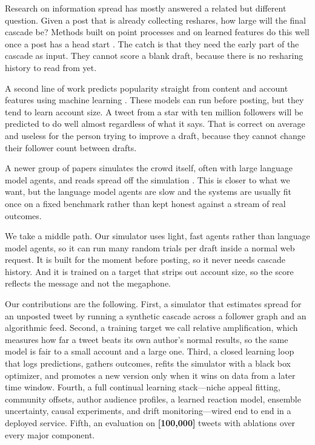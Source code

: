 \documentclass[11pt]{article}
\newcommand{\fill}[1]{\textbf{[#1]}}
\begin{document}
Research on information spread has mostly answered a related but different
question. Given a post that is already collecting reshares, how large will the
final cascade be? Methods built on point processes and on learned features do
this well once a post has a head start \cite{zhao2015seismic,cheng2014cascades}.
The catch is that they need the early part of the cascade as input. They cannot
score a blank draft, because there is no resharing history to read from yet.

A second line of work predicts popularity straight from content and account
features using machine learning \cite{rameez2022viralbert}. These models can run
before posting, but they tend to learn account size. A tweet from a star with
ten million followers will be predicted to do well almost regardless of what it
says. That is correct on average and useless for the person trying to improve a
draft, because they cannot change their follower count between drafts.

A newer group of papers simulates the crowd itself, often with large language
model agents, and reads spread off the simulation
\cite{liu2025popsim,park2023agents}. This is closer to what we want, but the
language model agents are slow and the systems are usually fit once on a fixed
benchmark rather than kept honest against a stream of real outcomes.

We take a middle path. Our simulator uses light, fast agents rather than
language model agents, so it can run many random trials per draft inside a normal
web request. It is built for the moment before posting, so it never needs cascade
history. And it is trained on a target that strips out account size, so the score
reflects the message and not the megaphone.

Our contributions are the following. First, a simulator that estimates spread for
an unposted tweet by running a synthetic cascade across a follower graph and an
algorithmic feed. Second, a training target we call relative amplification, which
measures how far a tweet beats its own author's normal results, so the same model
is fair to a small account and a large one. Third, a closed learning loop that
logs predictions, gathers outcomes, refits the simulator with a black box
optimizer, and promotes a new version only when it wins on data from a later time
window. Fourth, a full continual learning stack---niche appeal fitting,
community offsets, author audience profiles, a learned reaction model, ensemble
uncertainty, causal experiments, and drift monitoring---wired end to end in a
deployed service. Fifth, an evaluation on \fill{100{,}000} tweets with ablations
over every major component.
\end{document}
